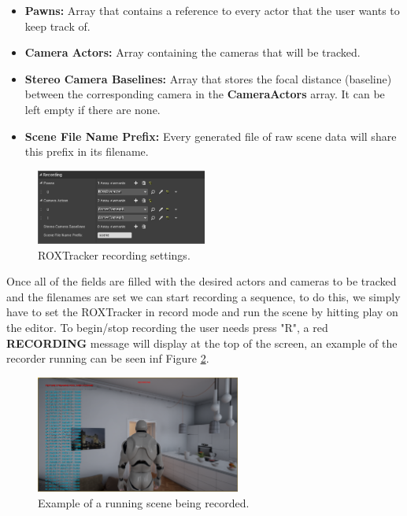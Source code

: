 \begin{itemize}
	\item \textbf{Pawns:} Array that contains a reference to every actor that the user wants to keep track of.
	\item \textbf{Camera Actors:} Array containing the cameras that will be tracked.
	\item \textbf{Stereo Camera Baselines:} Array that stores the focal distance (baseline) between the corresponding camera in the \textbf{CameraActors} array. It can be left empty if there are none.
	\item \textbf{Scene File Name Prefix:} Every generated file of raw scene data will share this prefix in its filename.
\end{itemize}

\begin{figure}[h]
	\includegraphics[width=0.5\textwidth]{archivos/recording_settings.png}
	\centering
	\caption{ROXTracker recording settings.}
	\label{fig:recording_settings}
\end{figure}

Once all of the fields are filled with the desired actors and cameras to be tracked and the filenames are set we can start recording a sequence, to do this, we simply have to set the ROXTracker in record mode and run the scene by hitting play on the editor. To begin/stop recording the user needs press "R", a red \textbf{RECORDING} message will display at the top of the screen, an example of the recorder running can be seen inf Figure \ref{fig:recording}.

\begin{figure}[h]
	\includegraphics[width=0.6\textwidth]{archivos/recording.png}
	\centering
	\caption{Example of a running scene being recorded.}
	\label{fig:recording}
\end{figure}

